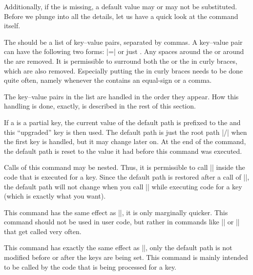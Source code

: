 Additionally, if the  is missing, a default value may or may not be
substituted. Before we plunge into all the details, let us have a quick look at
the command itself.

\begin{command}{\pgfkeys{}}
    The  should be a list of key--value pairs, separated by
    commas. A key--value pair can have the following two forms:
    |=| or just . Any spaces around the
     or around the  are removed. It is permissible to
    surround both the  or the  in curly braces, which are
    also removed. Especially putting the  in curly braces needs to
    be done quite often, namely whenever the  contains an
    equal-sign or a comma.

    The key--value pairs in the list are handled in the order they appear. How
    this handling is done, exactly, is described in the rest of this section.

    If a  is a partial key, the current value of the default path is
    prefixed to the  and this ``upgraded'' key is then used. The
    default path is just the root path |/| when the first key is handled, but
    it may change later on. At the end of the command, the default path is
    reset to the value it had before this command was executed.

    Calls of this command may be nested. Thus, it is permissible to call
    |\pgfkeys| inside the code that is executed for a key. Since the default
    path is restored after a call of |\pgfkeys|, the default path will not
    change when you call |\pgfkeys| while executing code for a key (which is
    exactly what you want).
\end{command}

\begin{command}{\pgfqkeys{}}
    This command has the same effect as ||, it is only marginally quicker. This command
    should not be used in user code, but rather in commands like |\tikzset| or
    |\pgfset| that get called very often.
\end{command}

\begin{command}{\pgfkeysalso{}}
    This command has exactly the same effect as |\pgfkeys|, only the default
    path is not modified before or after the keys are being set. This command
    is mainly intended to be called by the code that is being processed for a
    key.
\end{command}

